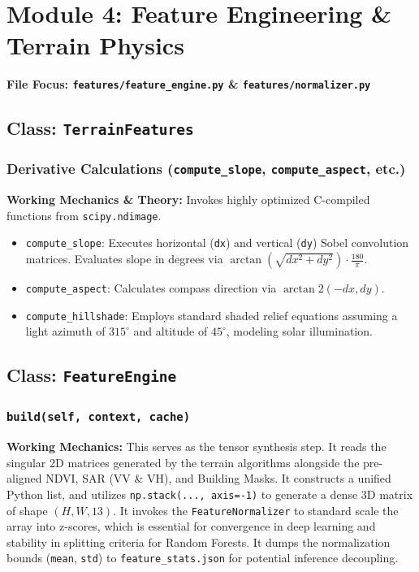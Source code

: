 \documentclass[11pt,a4paper,oneside]{report}
\begin{document}
\chapter{Module 4: Feature Engineering \& Terrain Physics}
\textbf{File Focus: \texttt{features/feature\_engine.py} \& \texttt{features/normalizer.py}}

\section{Class: \texttt{TerrainFeatures}}
\subsection{Derivative Calculations (\texttt{compute\_slope}, \texttt{compute\_aspect}, etc.)}
\textbf{Working Mechanics \& Theory:} Invokes highly optimized C-compiled functions from \texttt{scipy.ndimage}. 
\begin{itemize}
    \item \texttt{compute\_slope}: Executes horizontal (\texttt{dx}) and vertical (\texttt{dy}) Sobel convolution matrices. Evaluates slope in degrees via $\arctan(\sqrt{dx^2 + dy^2}) \cdot \frac{180}{\pi}$.
    \item \texttt{compute\_aspect}: Calculates compass direction via $\arctan2(-dx, dy)$.
    \item \texttt{compute\_hillshade}: Employs standard shaded relief equations assuming a light azimuth of $315^\circ$ and altitude of $45^\circ$, modeling solar illumination.
\end{itemize}

\section{Class: \texttt{FeatureEngine}}
\subsection{\texttt{build(self, context, cache)}}
\textbf{Working Mechanics:} This serves as the tensor synthesis step. It reads the singular 2D matrices generated by the terrain algorithms alongside the pre-aligned NDVI, SAR (VV \& VH), and Building Masks.
It constructs a unified Python list, and utilizes \texttt{np.stack(..., axis=-1)} to generate a dense 3D matrix of shape $(H, W, 13)$.
It invokes the \texttt{FeatureNormalizer} to standard scale the array into z-scores, which is essential for convergence in deep learning and stability in splitting criteria for Random Forests. It dumps the normalization bounds (\texttt{mean}, \texttt{std}) to \texttt{feature\_stats.json} for potential inference decoupling.
\end{document}
